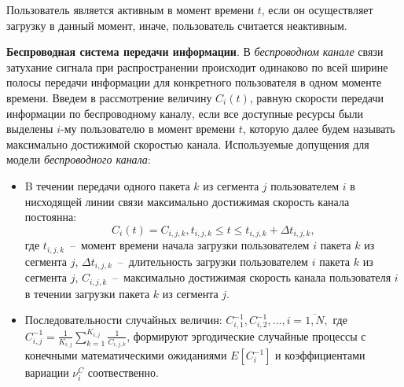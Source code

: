 Пользователь является активным в момент времени $t$, если он осуществляет загрузку в данный момент, иначе, пользователь считается неактивным.

\textbf{Беспроводная система передачи информации}. В \textit{беспроводном канале} связи затухание сигнала при распространении происходит одинаково по всей ширине полосы передачи информации для конкретного пользователя в одном моменте времени. Введем в рассмотрение величину $C_i(t)$, равную скорости передачи информации по беспроводному каналу, если все доступные ресурсы были выделены $i$-му пользователю в момент времени $t$, которую далее будем называть максимально достижимой скоростью канала.
\newline
Используемые допущения для модели \textit{беспроводного канала}:
\begin{itemize}
	\item B течении передачи одного пакета $k$ из сегмента $j$ пользователем $i$ в нисходящей линии связи максимально достижимая скорость канала постоянна: $$C_i(t)=C_{i,j,k}, t_{i,j,k} \leq t \leq t_{i,j,k}+\Delta t_{i,j,k},$$
	где $t_{i,j,k}$~--~момент времени начала загрузки пользователем $i$ пакета $k$ из сегмента $j$, $\Delta t_{i,j,k}$~--~длительность загрузки пользователем $i$ пакета $k$ из сегмента $j$, $C_{i,j,k}$~--~максимально достижимая скорость канала пользователя $i$ в течении загрузки пакета $k$ из сегмента $j$.
	\item Последовательности случайных величин: $C^{-1}_{i,1}, C^{-1}_{i,2}, \ldots, i=\overline{1,N},$
	где $C_{i,j}^{-1} = \frac{1}{K_{i,j}}\sum\limits_{k=1}^{K_{i,j}} \frac{1}{C_{i,j,k}}$, формируют эргодические случайные процессы с конечными математическими ожиданиями $E[C_i^{-1}]$ и коэффициентами вариации $\nu^{C}_i$ соотвественно.
\end{itemize}

